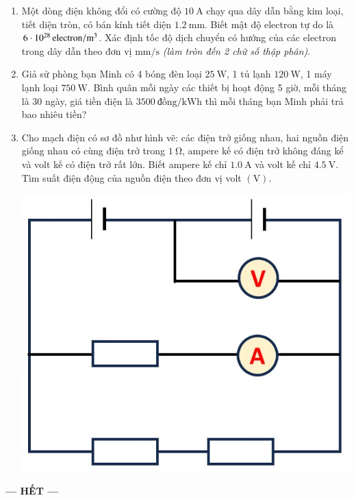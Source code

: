\begin{enumerate}[label=\bfseries Câu \arabic*:]
\item  Một dòng điện không  đổi có cường độ $\SI{10}{\ampere}$ chạy qua dây dẫn bằng kim loại, tiết diện tròn, có bán kính tiết diện $\SI{1.2}{\milli\meter}$. Biết mật độ electron tự do là $\SI{6E28}{\text{electron}/\meter^3}$. Xác định tốc độ dịch chuyển có hướng của các electron trong dây dẫn theo đơn vị $\si{\milli\meter/\second}$ \textit{(làm tròn đến 2 chữ số thập phân)}.

\item Giả sử phòng bạn Minh có 4 bóng đèn loại $\SI{25}{\watt}$, 1 tủ lạnh $\SI{120}{\watt}$, 1 máy lạnh loại $\SI{750}{\watt}$. Bình quân mỗi ngày các thiết bị hoạt động 5 giờ, mỗi tháng là 30 ngày, giá tiền điện là $\SI{3500}{\text{đồng}/\kilo\watt\hour}$ thì mỗi tháng bạn Minh phải trả bao nhiêu tiền?
	\item Cho mạch điện có sơ đồ như hình vẽ: các điện trở giống nhau, hai nguồn điện giống nhau có cùng điện trở trong $\SI{1}{\ohm}$, ampere kế có điện trở không đáng kể và volt kế có điện trở rất lớn. Biết ampere kế chỉ $\SI{1.0}{\ampere}$ và volt kế chỉ $\SI{4.5}{\volt}$. Tìm suất điện động của nguồn điện theo đơn vị volt $\left(\si{\volt}\right)$.
	\begin{center}
		\includegraphics[width=0.35\linewidth]{../figs/PH11-FinalSem2-02-3}
	\end{center}
\end{enumerate}
\begin{center}
	\textbf{--- HẾT ---}
\end{center}